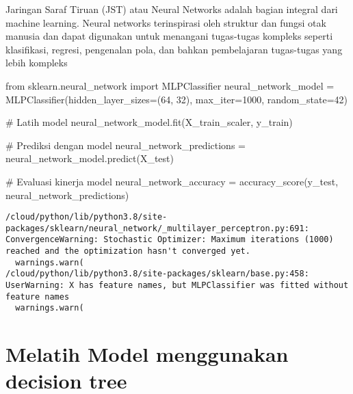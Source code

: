 \documentclass[
  letterpaper,
]{krantz}
\makeatletter
\newenvironment{Shaded}{\begin{snugshade}}{\end{snugshade}}
\newcommand{\CommentTok}[1]{\textcolor[rgb]{0.37,0.37,0.37}{#1}}
\newcommand{\DecValTok}[1]{\textcolor[rgb]{0.68,0.00,0.00}{#1}}
\newcommand{\ImportTok}[1]{\textcolor[rgb]{0.00,0.46,0.62}{#1}}
\newcommand{\NormalTok}[1]{\textcolor[rgb]{0.00,0.23,0.31}{#1}}
\newcommand{\OperatorTok}[1]{\textcolor[rgb]{0.37,0.37,0.37}{#1}}
\newenvironment{kframe}{%
\medskip{}
\setlength{\fboxsep}{.8em}
 \def\at@end@of@kframe{}%
 \ifinner\ifhmode%
  \def\at@end@of@kframe{\end{minipage}}%
  \begin{minipage}{\columnwidth}%
 \fi\fi%
 \def\FrameCommand##1{\hskip\@totalleftmargin \hskip-\fboxsep
 \colorbox{shadecolor}{##1}\hskip-\fboxsep
     \hskip-\linewidth \hskip-\@totalleftmargin \hskip\columnwidth}%
 \MakeFramed {\advance\hsize-\width
   \@totalleftmargin\z@ \linewidth\hsize
   \@setminipage}}%
 {\par\unskip\endMakeFramed%
 \at@end@of@kframe}
\renewenvironment{Shaded}{\begin{kframe}}{\end{kframe}}
\makeatother
\begin{document}

Jaringan Saraf Tiruan (JST) atau Neural Networks adalah bagian integral
dari machine learning. Neural networks terinspirasi oleh struktur dan
fungsi otak manusia dan dapat digunakan untuk menangani tugas-tugas
kompleks seperti klasifikasi, regresi, pengenalan pola, dan bahkan
pembelajaran tugas-tugas yang lebih kompleks

\begin{Shaded}
\begin{Highlighting}[]
\ImportTok{from}\NormalTok{ sklearn.neural\_network }\ImportTok{import}\NormalTok{ MLPClassifier}
\NormalTok{neural\_network\_model }\OperatorTok{=}\NormalTok{ MLPClassifier(hidden\_layer\_sizes}\OperatorTok{=}\NormalTok{(}\DecValTok{64}\NormalTok{, }\DecValTok{32}\NormalTok{), max\_iter}\OperatorTok{=}\DecValTok{1000}\NormalTok{, random\_state}\OperatorTok{=}\DecValTok{42}\NormalTok{)}

\CommentTok{\# Latih model}
\NormalTok{neural\_network\_model.fit(X\_train\_scaler, y\_train)}

\CommentTok{\# Prediksi dengan model}
\NormalTok{neural\_network\_predictions }\OperatorTok{=}\NormalTok{ neural\_network\_model.predict(X\_test)}

\CommentTok{\# Evaluasi kinerja model}
\NormalTok{neural\_network\_accuracy }\OperatorTok{=}\NormalTok{ accuracy\_score(y\_test, neural\_network\_predictions)}
\end{Highlighting}
\end{Shaded}

\begin{verbatim}
/cloud/python/lib/python3.8/site-packages/sklearn/neural_network/_multilayer_perceptron.py:691: ConvergenceWarning: Stochastic Optimizer: Maximum iterations (1000) reached and the optimization hasn't converged yet.
  warnings.warn(
/cloud/python/lib/python3.8/site-packages/sklearn/base.py:458: UserWarning: X has feature names, but MLPClassifier was fitted without feature names
  warnings.warn(
\end{verbatim}

\hypertarget{melatih-model-menggunakan-decision-tree}{%
\section*{Melatih Model menggunakan decision
tree}\label{melatih-model-menggunakan-decision-tree}}
\end{document}
